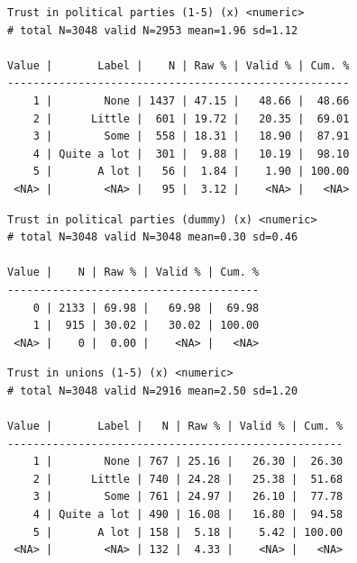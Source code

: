 \documentclass[
  letterpaper,
  DIV=11,
  numbers=noendperiod]{scrreprt}
\newenvironment{Shaded}{\begin{snugshade}}{\end{snugshade}}
\newcommand{\FunctionTok}[1]{\textcolor[rgb]{0.28,0.35,0.67}{#1}}
\newcommand{\NormalTok}[1]{\textcolor[rgb]{0.00,0.23,0.31}{#1}}
\newcommand{\SpecialCharTok}[1]{\textcolor[rgb]{0.37,0.37,0.37}{#1}}
\begin{document}
\begin{verbatim}
Trust in political parties (1-5) (x) <numeric> 
# total N=3048 valid N=2953 mean=1.96 sd=1.12

Value |       Label |    N | Raw % | Valid % | Cum. %
-----------------------------------------------------
    1 |        None | 1437 | 47.15 |   48.66 |  48.66
    2 |      Little |  601 | 19.72 |   20.35 |  69.01
    3 |        Some |  558 | 18.31 |   18.90 |  87.91
    4 | Quite a lot |  301 |  9.88 |   10.19 |  98.10
    5 |       A lot |   56 |  1.84 |    1.90 | 100.00
 <NA> |        <NA> |   95 |  3.12 |    <NA> |   <NA>
\end{verbatim}

\begin{Shaded}
\end{Shaded}

\begin{verbatim}
Trust in political parties (dummy) (x) <numeric> 
# total N=3048 valid N=3048 mean=0.30 sd=0.46

Value |    N | Raw % | Valid % | Cum. %
---------------------------------------
    0 | 2133 | 69.98 |   69.98 |  69.98
    1 |  915 | 30.02 |   30.02 | 100.00
 <NA> |    0 |  0.00 |    <NA> |   <NA>
\end{verbatim}

\begin{Shaded}
\end{Shaded}

\begin{verbatim}
Trust in unions (1-5) (x) <numeric> 
# total N=3048 valid N=2916 mean=2.50 sd=1.20

Value |       Label |   N | Raw % | Valid % | Cum. %
----------------------------------------------------
    1 |        None | 767 | 25.16 |   26.30 |  26.30
    2 |      Little | 740 | 24.28 |   25.38 |  51.68
    3 |        Some | 761 | 24.97 |   26.10 |  77.78
    4 | Quite a lot | 490 | 16.08 |   16.80 |  94.58
    5 |       A lot | 158 |  5.18 |    5.42 | 100.00
 <NA> |        <NA> | 132 |  4.33 |    <NA> |   <NA>
\end{verbatim}
\end{document}
